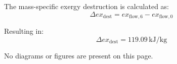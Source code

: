 The mass-specific exergy destruction is calculated as:  
\[
\Delta ex_{\text{dest}} = ex_{\text{flow},6} - ex_{\text{flow},0}
\]  

Resulting in:  
\[
\Delta ex_{\text{dest}} = 119.09 \, \text{kJ/kg}
\]  

No diagrams or figures are present on this page.